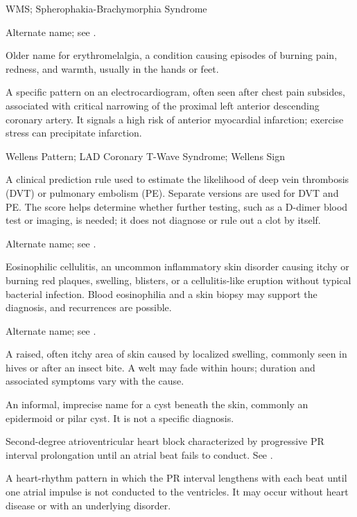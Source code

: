 \synonyms
WMS; Spherophakia-Brachymorphia Syndrome

 Alternate name; see .

 Older name for erythromelalgia, a condition causing episodes of burning pain, redness, and warmth, usually in the hands or feet.

 A specific pattern on an electrocardiogram, often seen after chest pain subsides, associated with critical narrowing of the proximal left anterior descending coronary artery. It signals a high risk of anterior myocardial infarction; exercise stress can precipitate infarction.

\synonyms
Wellens Pattern; LAD Coronary T-Wave Syndrome; Wellens Sign

 A clinical prediction rule used to estimate the likelihood of deep vein thrombosis (DVT) or pulmonary embolism (PE). Separate versions are used for DVT and PE. The score helps determine whether further testing, such as a D-dimer blood test or imaging, is needed; it does not diagnose or rule out a clot by itself.

 Alternate name; see .

 Eosinophilic cellulitis, an uncommon inflammatory skin disorder causing itchy or burning red plaques, swelling, blisters, or a cellulitis-like eruption without typical bacterial infection. Blood eosinophilia and a skin biopsy may support the diagnosis, and recurrences are possible.

 Alternate name; see .

 A raised, often itchy area of skin caused by localized swelling, commonly seen in hives or after an insect bite. A welt may fade within hours; duration and associated symptoms vary with the cause.

 An informal, imprecise name for a cyst beneath the skin, commonly an epidermoid or pilar cyst. It is not a specific diagnosis.

 Second-degree atrioventricular heart block characterized by progressive PR interval prolongation until an atrial beat fails to conduct. See .

 A heart-rhythm pattern in which the PR interval lengthens with each beat until one atrial impulse is not conducted to the ventricles. It may occur without heart disease or with an underlying disorder.

